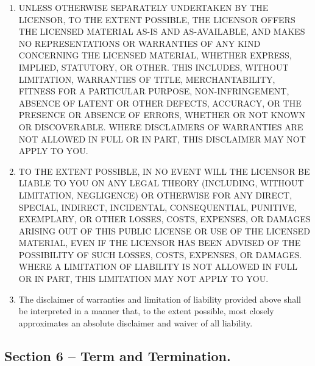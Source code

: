 \begin{enumerate}
\item
  UNLESS OTHERWISE SEPARATELY UNDERTAKEN BY THE LICENSOR, TO THE EXTENT
  POSSIBLE, THE LICENSOR OFFERS THE LICENSED MATERIAL AS-IS AND
  AS-AVAILABLE, AND MAKES NO REPRESENTATIONS OR WARRANTIES OF ANY KIND
  CONCERNING THE LICENSED MATERIAL, WHETHER EXPRESS, IMPLIED, STATUTORY,
  OR OTHER. THIS INCLUDES, WITHOUT LIMITATION, WARRANTIES OF TITLE,
  MERCHANTABILITY, FITNESS FOR A PARTICULAR PURPOSE, NON-INFRINGEMENT,
  ABSENCE OF LATENT OR OTHER DEFECTS, ACCURACY, OR THE PRESENCE OR
  ABSENCE OF ERRORS, WHETHER OR NOT KNOWN OR DISCOVERABLE. WHERE
  DISCLAIMERS OF WARRANTIES ARE NOT ALLOWED IN FULL OR IN PART, THIS
  DISCLAIMER MAY NOT APPLY TO YOU.
\item
  TO THE EXTENT POSSIBLE, IN NO EVENT WILL THE LICENSOR BE LIABLE TO YOU
  ON ANY LEGAL THEORY (INCLUDING, WITHOUT LIMITATION, NEGLIGENCE) OR
  OTHERWISE FOR ANY DIRECT, SPECIAL, INDIRECT, INCIDENTAL,
  CONSEQUENTIAL, PUNITIVE, EXEMPLARY, OR OTHER LOSSES, COSTS, EXPENSES,
  OR DAMAGES ARISING OUT OF THIS PUBLIC LICENSE OR USE OF THE LICENSED
  MATERIAL, EVEN IF THE LICENSOR HAS BEEN ADVISED OF THE POSSIBILITY OF
  SUCH LOSSES, COSTS, EXPENSES, OR DAMAGES. WHERE A LIMITATION OF
  LIABILITY IS NOT ALLOWED IN FULL OR IN PART, THIS LIMITATION MAY NOT
  APPLY TO YOU.
\item
  The disclaimer of warranties and limitation of liability provided
  above shall be interpreted in a manner that, to the extent possible,
  most closely approximates an absolute disclaimer and waiver of all
  liability.
\end{enumerate}

\subsection*{Section 6 -- Term and Termination.}


